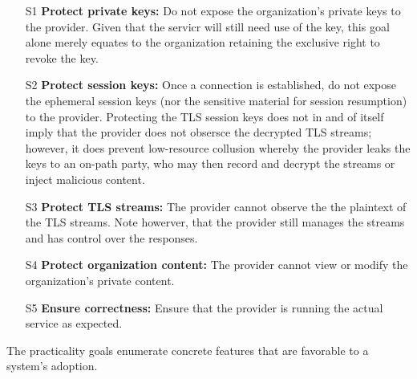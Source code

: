 \begin{enumerate}
    \item[S1] \textbf{Protect private keys:}
        Do not expose the organization's private keys to the provider.
        Given that the servicr will still need use of the key, this goal alone
        merely equates to the organization retaining the exclusive right to
        revoke the key.
    
    \item[S2] \textbf{Protect session keys:}
        Once a connection is established, do not expose the ephemeral session keys (nor
        the sensitive material for session resumption) to the provider.
        Protecting the TLS session keys does not in and of itself imply that
        the provider does not obsersce the decrypted TLS streams; however, it does
        prevent low-resource collusion whereby the provider leaks the keys to
        an on-path party, who may then record and decrypt the streams or
        inject malicious content.

    \item[S3] \textbf{Protect TLS streams:}
        The provider cannot observe the the plaintext of the TLS streams.
        Note howerver, that the provider still manages the streams and has
        control over the responses.

    \item[S4] \textbf{Protect organization content:}
        The provider cannot view or modify the organization's private content.

    \item[S5] \textbf{Ensure correctness:}
        Ensure that the provider is running the actual service as expected.

\end{enumerate}


%
The practicality goals enumerate concrete features that are favorable to a
system's adoption.

